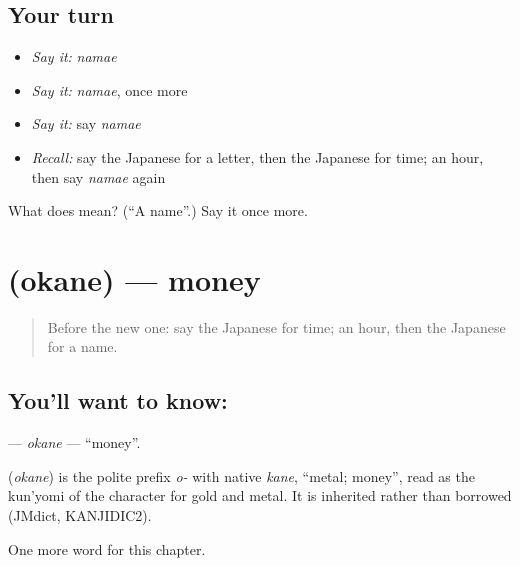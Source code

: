 \subsection*{Your turn}
\begin{itemize}
\raggedright
  \item \emph{Say it:} \emph{namae}
  \item \emph{Say it:} \emph{namae}, once more
  \item \emph{Say it:} say \emph{namae}
  \item \emph{Recall:} say the Japanese for a letter, then the Japanese for time; an hour, then say \emph{namae} again
\end{itemize}

\begin{tcolorbox}[breakable,colback=teal!4,colframe=teal!35!black,title={Before you move on}]
What does  mean? (\textquotedblleft{}A name\textquotedblright{}.) Say it once more.
\end{tcolorbox}
\section[\texorpdfstring{\ja{おかね} (okane)}{おかね (okane)}]{ (okane) — money}

\label{lesson:JA-C41-okane}



\begin{quote}
Before the new one: say the Japanese for time; an hour, then the Japanese for a name.
\end{quote}

\subsection*{You'll want to know: }
\textbf{} — \emph{okane} — \textquotedblleft{}money\textquotedblright{}.

\begin{cousinweb}
\textbf{} (\emph{okane}) is the polite prefix \emph{o-} with native \emph{kane}, \textquotedblleft{}metal; money\textquotedblright{}, read as the kun'yomi of the character for gold and metal. It is inherited rather than borrowed (JMdict, KANJIDIC2).
\end{cousinweb}

\begin{grammarlens}[title={What you've built}]
One more word for this chapter.
\end{grammarlens}

